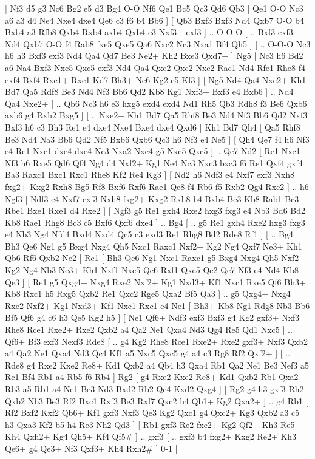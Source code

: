 \makegametitle 
|   Nf3   d5    g3   Nc6    Bg2   e5    d3   Bg4    O-O   Nf6    Qe1   Bc5    Qc3   Qd6    Qb3 [  Qe1 O-O  Nc3 a6  a3 d4  Ne4 Nxe4  dxe4 Qe6  c3 f6  b4 Bb6   ]  [  Qb3 Bxf3  Bxf3 Nd4  Qxb7 O-O  b4 Bxb4  a3 Rfb8  Qxb4 Rxb4  axb4 Qxb4  c3 Nxf3+  exf3   ] .. O-O-O [ .. Bxf3  exf3 Nd4  Qxb7 O-O  f4 Rab8  fxe5 Qxe5  Qa6 Nxc2  Nc3 Nxa1  Bf4 Qh5   ]  [ .. O-O-O  Nc3 h6  h3 Bxf3  exf3 Nd4  Qa4 Qd7  Be3 Ne2+  Kh2 Bxe3  Qxd7+   ]  Ng5 [  Nc3 h6  Bd2 a6  Na4 Bxf3  Nxc5 Qxc5  exf3 Nd4  Qa4 Qxc2  Qxc2 Nxc2  Rac1 Nd4  Rfe1 Rhe8  f4 exf4  Bxf4 Rxe1+  Rxe1 Kd7  Bh3+ Ne6  Kg2 c5  Kf3   ]  [  Ng5 Nd4  Qa4 Nxe2+  Kh1 Bd7  Qa5 Rdf8  Be3 Nd4  Nf3 Bb6  Qd2 Kb8  Kg1 Nxf3+  Bxf3 e4  Bxb6   ] .. Nd4    Qa4   Nxe2+ [ .. Qb6  Nc3 h6  e3 hxg5  exd4 exd4  Nd1 Rh5  Qb3 Rdh8  f3 Be6  Qxb6 axb6  g4 Rxh2  Bxg5   ]  [ .. Nxe2+  Kh1 Bd7  Qa5 Rhf8  Be3 Nd4  Nf3 Bb6  Qd2 Nxf3  Bxf3 h6  c3 Bh3  Re1 e4  dxe4 Nxe4  Bxe4 dxe4  Qxd6   ]  Kh1  Bd7    Qh4 [  Qa5 Rhf8  Be3 Nd4  Na3 Bb6  Qd2 Nf5  Bxb6 Qxb6  Qc3 h6  Nf3 e4  Ne5   ]  [  Qh4 Qe7  f4 h6  Nf3 e4  Re1 Nxc1  dxe4 dxe4  Nc3 Nxa2  Nxe4 g5  Nxc5 Qxc5   ] .. Qe7    Nd2 [  Re1 Nxc1  Nf3 h6  Rxe5 Qd6  Qf4 Ng4  d4 Nxf2+  Kg1 Ne4  Nc3 Nxc3  bxc3 f6  Re1 Qxf4  gxf4 Ba3  Raxc1 Bxc1  Rxc1 Rhe8  Kf2 Re4  Kg3   ]  [  Nd2 h6  Ndf3 e4  Nxf7 exf3  Nxh8 fxg2+  Kxg2 Rxh8  Bg5 Rf8  Bxf6 Rxf6  Rae1 Qe8  f4 Rb6  f5 Rxb2  Qg4 Rxc2   ] .. h6    Ngf3 [  Ndf3 e4  Nxf7 exf3  Nxh8 fxg2+  Kxg2 Rxh8  b4 Bxb4  Be3 Kb8  Rab1 Bc3  Rbe1 Bxe1  Rxe1 d4  Rxe2   ]  [  Ngf3 g5  Re1 gxh4  Rxe2 hxg3  fxg3 e4  Nb3 Bd6  Bd2 Kb8  Rae1 Rhg8  Bc3 c5  Bxf6 Qxf6  dxe4   ] .. Bg4 [ .. g5  Re1 gxh4  Rxe2 hxg3  fxg3 e4  Nb3 Ng4  Nfd4 Bxd4  Nxd4 Qc5  c3 exd3  Re1 Rhg8  Bd2 Rde8  Rf1   ]  [ .. Bg4  Bh3 Qe6  Ng1 g5  Bxg4 Nxg4  Qh5 Nxc1  Raxc1 Nxf2+  Kg2 Ng4  Qxf7 Ne3+  Kh1 Qb6  Rf6 Qxb2  Ne2   ]  Re1 [  Bh3 Qe6  Ng1 Nxc1  Raxc1 g5  Bxg4 Nxg4  Qh5 Nxf2+  Kg2 Ng4  Nb3 Ne3+  Kh1 Nxf1  Nxc5 Qc6  Rxf1 Qxc5  Qe2 Qe7  Nf3 e4  Nd4 Kb8  Qe3   ]  [  Re1 g5  Qxg4+ Nxg4  Rxe2 Nxf2+  Kg1 Nxd3+  Kf1 Nxc1  Rxe5 Qf6  Bh3+ Kb8  Rxc1 h5  Rxg5 Qxb2  Re1 Qxc2  Rge5 Qxa2  Bf5 Qa3   ] .. g5    Qxg4+   Nxg4    Rxe2   Nxf2+    Kg1   Nxd3+    Kf1   Nxc1    Rxc1   e4    Ne1 [  Bh3+ Kb8  Ng1 Rdg8  Nb3 Bb6  Bf5 Qf6  g4 c6  h3 Qe5  Kg2 h5   ]  [  Ne1 Qf6+  Ndf3 exf3  Bxf3 g4  Kg2 gxf3+  Nxf3 Rhe8  Rce1 Rxe2+  Rxe2 Qxb2  a4 Qa2  Ne1 Qxa4  Nd3 Qg4  Re5 Qd1  Nxc5   ] .. Qf6+    Bf3   exf3    Nexf3   Rde8 [ .. g4  Kg2 Rhe8  Rce1 Rxe2+  Rxe2 gxf3+  Nxf3 Qxb2  a4 Qa2  Ne1 Qxa4  Nd3 Qc4  Kf1 a5  Nxc5 Qxc5  g4 a4  c3 Rg8  Rf2 Qxf2+   ]  [ .. Rde8  g4 Rxe2  Kxe2 Re8+  Kd1 Qxb2  a4 Qb4  h3 Qxa4  Rb1 Qa2  Ne1 Be3  Nef3 a5  Rc1 Bf4  Rb1 a4  Rb5 f6  Rb4   ]  Rg2 [  g4 Rxe2  Kxe2 Re8+  Kd1 Qxb2  Rb1 Qxa2  Rb3 a5  Rb1 a4  Ne1 Be3  Nd3 Bxd2  Rb2 Qc4  Kxd2 Qxg4   ]  [  Rg2 g4  h3 gxf3  Rh2 Qxb2  Nb3 Be3  Rf2 Bxc1  Rxf3 Be3  Rxf7 Qxc2  h4 Qb1+  Kg2 Qxa2+   ] .. g4    Rb1 [  Rf2 Bxf2  Kxf2 Qb6+  Kf1 gxf3  Nxf3 Qe3  Kg2 Qxc1  g4 Qxc2+  Kg3 Qxb2  a3 c5  h3 Qxa3  Kf2 b5  h4 Re3  Nh2 Qd3   ]  [  Rb1 gxf3  Re2 fxe2+  Kg2 Qf2+  Kh3 Re5  Kh4 Qxh2+  Kg4 Qh5+  Kf4 Qf5#   ] .. gxf3    [ .. gxf3  b4 fxg2+  Kxg2 Re2+  Kh3 Qe6+  g4 Qe3+  Nf3 Qxf3+  Kh4 Rxh2#   ] 0-1  |
